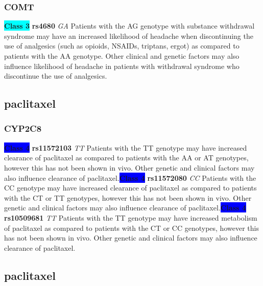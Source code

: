 \documentclass{book}
\begin{document}
\subsubsection{ COMT }

\begin{center}
\textbf{\colorbox{cyan} {Class 3}} \textbf{ rs4680 } \textit{ GA }
Patients with the AG genotype with substance withdrawal syndrome may have an increased likelihood of headache when discontinuing the use of analgesics (such as opioids, NSAIDs, triptans, ergot) as compared to patients with the AA genotype. Other clinical and genetic factors may also influence likelihood of headache in patients with withdrawal syndrome who discontinue the use of analgesics.


\end{center}\subsection{ paclitaxel }


\subsubsection{ CYP2C8 }

\begin{center}

\textbf{\colorbox{blue} {Class 4}} \textbf{ rs11572103 } \textit{ TT }
Patients with the TT genotype may have increased clearance of paclitaxel as compared to patients with the AA or AT genotypes, however this has not been shown in vivo. Other genetic and clinical factors may also influence clearance of paclitaxel.\textbf{\colorbox{blue} {Class 4}} \textbf{ rs11572080 } \textit{ CC }
Patients with the CC genotype may have increased clearance of paclitaxel as compared to patients with the CT or TT genotypes, however this has not been shown in vivo. Other genetic and clinical factors may also influence clearance of paclitaxel.\textbf{\colorbox{blue} {Class 4}} \textbf{ rs10509681 } \textit{ TT }
Patients with the TT genotype may have increased metabolism of paclitaxel as compared to patients with the CT or CC genotypes, however this has not been shown in vivo. Other genetic and clinical factors may also influence clearance of paclitaxel.

\end{center}\subsection{ paclitaxel }
\end{document}
